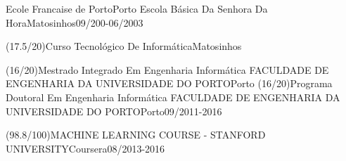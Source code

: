 

\begin{cventries}
  \cventry
{}{Ecole Francaise de Porto}{Porto}{}
{}  \cventry
{}{Escola Básica Da Senhora Da Hora}{Matosinhos}{09/200-06/2003}
{}\end{cventries}

\begin{cventries}
  \cventry
{(17.5/20)}{Curso Tecnológico De Informática}{Matosinhos}{}
{}\end{cventries}

\begin{cventries}
  \cventry
{(16/20)}{Mestrado Integrado Em Engenharia Informática FACULDADE DE ENGENHARIA DA UNIVERSIDADE DO PORTO}{Porto}{}
{}  \cventry
{(16/20)}{Programa Doutoral Em Engenharia Informática FACULDADE DE ENGENHARIA DA UNIVERSIDADE DO PORTO}{Porto}{09/2011-2016}
{}\end{cventries}

\begin{cventries}
  \cventry
{(98.8/100)}{MACHINE LEARNING COURSE - STANFORD UNIVERSITY}{Coursera}{08/2013-2016}
{}\end{cventries}
